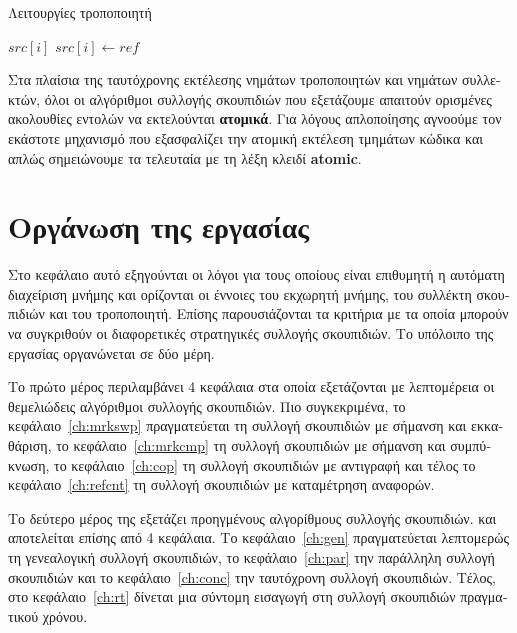 \begin{greek}
\begin{algorithm}
  \caption{Λειτουργίες τροποποιητή}
  \label{alg:intro1}
  \begin{algorithmic}[1]
      \State {}
    \EndFunction
    \Statex
      \State \Return $src[i]$
    \EndFunction
    \Statex
      \State $src[i] \gets ref$
    \EndProcedure
  \end{algorithmic}
\end{algorithm}

Στα πλαίσια της ταυτόχρονης εκτέλεσης νημάτων τροποποιητών
και νημάτων συλλεκτών, όλοι οι αλγόριθμοι συλλογής σκουπιδιών
που εξετάζουμε απαιτούν ορισμένες ακολουθίες εντολών να
εκτελούνται \textbf{ατομικά}. Για λόγους απλοποίησης αγνοούμε
τον εκάστοτε μηχανισμό που εξασφαλίζει την ατομική εκτέλεση
τμημάτων κώδικα και απλώς σημειώνουμε τα τελευταία με τη λέξη
κλειδί \textbf{atomic}. 

\section{Οργάνωση της εργασίας}
Στο κεφάλαιο αυτό εξηγούνται οι λόγοι για τους οποίους είναι
επιθυμητή η αυτόματη διαχείριση μνήμης και ορίζονται οι
έννοιες του εκχωρητή μνήμης, του συλλέκτη σκουπιδιών και του
τροποποιητή. Επίσης παρουσιάζονται τα κριτήρια με τα οποία
μπορούν να συγκριθούν οι διαφορετικές στρατηγικές συλλογής
σκουπιδιών. Το υπόλοιπο της εργασίας οργανώνεται σε δύο μέρη.

Το πρώτο μέρος περιλαμβάνει 4 κεφάλαια στα οποία εξετάζονται
με λεπτομέρεια οι θεμελιώδεις αλγόριθμοι συλλογής σκουπιδιών.
Πιο συγκεκριμένα, το κεφάλαιο~\ref{ch:mrkswp} πραγματεύεται τη
συλλογή σκουπιδιών με σήμανση και εκκαθάριση, το κεφάλαιο~\ref{ch:mrkcmp}
τη συλλογή σκουπιδιών με σήμανση και συμπύκνωση, το κεφάλαιο~\ref{ch:cop}
τη συλλογή σκουπιδιών με αντιγραφή και τέλος το κεφάλαιο~\ref{ch:refcnt}
τη συλλογή σκουπιδιών με καταμέτρηση αναφορών.  

Το δεύτερο μέρος της εξετάζει προηγμένους αλγορίθμους συλλογής
σκουπιδιών. και αποτελείται επίσης από 4 κεφάλαια. Το κεφάλαιο~\ref{ch:gen}
πραγματεύεται λεπτομερώς τη γενεαλογική συλλογή σκουπιδιών, το
κεφάλαιο~\ref{ch:par} την παράλληλη συλλογή σκουπιδιών και το
κεφάλαιο~\ref{ch:conc} την ταυτόχρονη συλλογή σκουπιδιών. Τέλος,
στο κεφάλαιο~\ref{ch:rt} δίνεται μια σύντομη εισαγωγή στη
συλλογή σκουπιδιών πραγματικού χρόνου.

\end{greek}
